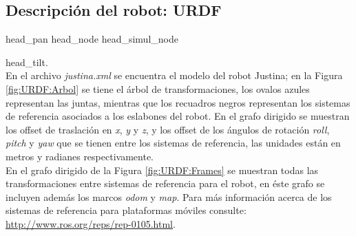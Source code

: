 \documentclass[user_manual.tex]{subfiles}
\begin{document}

\subsection{Descripción del robot: URDF}
head\_pan        head\_node head\_simul\_node

head\_tilt.\\

En el archivo \textit{justina.xml} se encuentra el modelo del robot Justina; en la Figura   \ref{fig:URDF:Arbol} se tiene el árbol de transformaciones, los ovalos azules representan las juntas, mientras que los recuadros negros representan los sistemas de referencia asociados a los eslabones del robot. En el grafo dirigido se muestran los offset de traslación en \textit{x}, \textit{y} y \textit{z}, y los offset de los ángulos de rotación \textit{roll}, \textit{pitch} y \textit{yaw} que se tienen entre los sistemas de referencia, las unidades están en metros y radianes respectivamente.\\

En el grafo dirigido de la Figura \ref{fig:URDF:Frames} se muestran todas las transformaciones entre sistemas de referencia para el robot, en éste grafo se incluyen además los marcos \textit{odom} y \textit{map}. Para más información acerca de los sistemas de referencia para plataformas móviles consulte: \url{http://www.ros.org/reps/rep-0105.html}.
\end{document}
